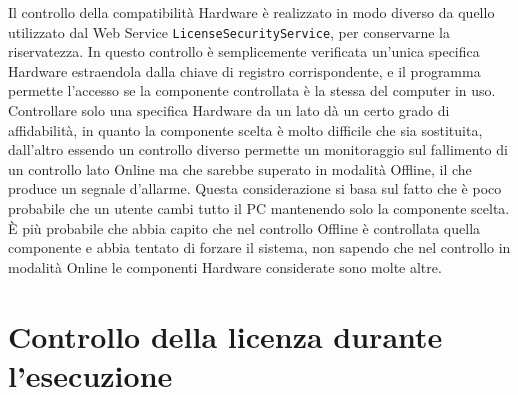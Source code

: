 Il controllo della compatibilità Hardware è realizzato in modo diverso da quello utilizzato dal Web Service \texttt{LicenseSecurityService}, per conservarne la riservatezza. In questo controllo è semplicemente verificata un'unica specifica Hardware estraendola dalla chiave di registro corrispondente, e il programma permette l'accesso se la componente controllata è la stessa del computer in uso. Controllare solo una specifica Hardware da un lato dà un certo grado di affidabilità, in quanto la componente scelta è molto difficile che sia sostituita, dall'altro essendo un controllo diverso permette un monitoraggio sul fallimento di un controllo lato Online ma che sarebbe superato in modalità Offline, il che produce un segnale d'allarme. Questa considerazione si basa sul fatto che è poco probabile che un utente cambi tutto il PC mantenendo solo la componente scelta. È più probabile che abbia capito che nel controllo Offline è controllata quella componente e abbia tentato di forzare il sistema, non sapendo che nel controllo in modalità Online le componenti Hardware considerate sono molte altre.


\section{Controllo della licenza durante l'esecuzione}
\label{uniqueid}

